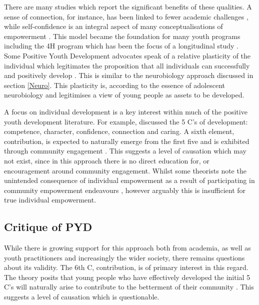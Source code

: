 There are many studies which report the significant benefits of these qualities. A sense of connection, for instance, has been linked to fewer academic challenges \citep{Youngblade2007}, while self-confidence is an integral aspect of many conceptualisations of empowerment \citep{Murphy-Graham2008}. This model became the foundation for many youth programs including the 4H program which has been the focus of a longitudinal study . Some Positive Youth Development advocates speak of a relative plasticity of the individual which legitimates the proposition that all individuals can successfully and positively develop \citep{Lerner2010}. This is similar to the neurobiology approach discussed in section \ref{Neuro}. This plasticity is, according to \citet{Lerner2010} the essence of adolescent neurobiology and legitimises a view of young people as assets to be developed. 

A focus on individual development is a key interest within much of the positive youth development literature. For example, \citet{Sherrod2007} discussed the 5 C's of development: competence, character, confidence, connection and caring. A sixth element, contribution, is expected to naturally emerge from the first five and is exhibited through community engagement \citep{Sherrod2007}. This suggests a level of causation which may not exist, since in this approach there is no direct education for, or encouragement around community engagement. Whilst some theorists note the unintended consequence of individual empowerment as a result of participating in community empowerment endeavours \citep{Jennings2006}, however arguably this is insufficient for true individual empowerment.



\subsection{Critique of PYD}
While there is growing support for this approach both from academia, as well as youth practitioners and increasingly the wider society, there remains questions about its validity. The 6th C, contribution, is of primary interest in this regard. The theory posits that young people who have effectively developed the initial 5 C's will naturally arise to contribute to the betterment of their community \citep{Sherrod2007}. This suggests a level of causation which is questionable. 

